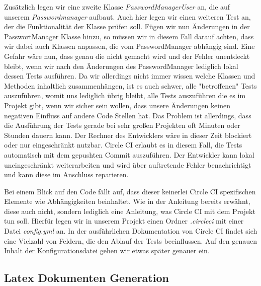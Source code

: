 \documentclass[11pt]{article}
\begin{document}
Zusätzlich legen wir eine zweite Klasse \textit{PasswordManagerUser} an, die auf unserem \textit{Passwordmanager} aufbaut. Auch hier legen wir einen weiteren Test an, der die Funktionalität der Klasse prüfen soll. Fügen wir nun Änderungen in der PasswortManager Klasse hinzu, so müssen wir in diesem Fall darauf achten, dass wir dabei auch Klassen anpassen, die vom PasswordManager abhängig sind. Eine Gefahr wäre nun, dass genau die nicht gemacht wird und der Fehler unentdeckt bleibt, wenn wir nach den Änderungen des PasswordManager lediglich lokal dessen Tests ausführen. Da wir allerdings nicht immer wissen welche Klassen und Methoden inhaltlich zusammenhängen, ist es auch  schwer, alle "betroffenen" Tests auszuführen, womit uns lediglich übrig bleibt, alle Tests auszuführen die es im Projekt gibt, wenn wir sicher sein wollen, dass unsere Änderungen keinen negativen Einfluss auf andere Code Stellen hat. Das Problem ist allerdings, dass die Ausführung der Tests gerade bei sehr großen Projekten oft Minuten oder Stunden dauern kann. Der Rechner des Entwicklers wäre in dieser Zeit blockiert oder nur eingeschränkt nutzbar. Circle CI erlaubt es in diesem Fall, die Tests automatisch mit dem gepushten Commit auszuführen. Der Entwickler kann lokal uneingeschränkt weiterarbeiten und wird über auftretende Fehler benachrichtigt und kann diese im Anschluss reparieren.

Bei einem Blick auf den Code fällt auf, dass dieser keinerlei Circle CI spezifischen Elemente wie Abhängigkeiten beinhaltet. Wie in der Anleitung bereits erwähnt, diese auch nicht, sondern lediglich eine Anleitung, was Circle CI mit dem Projekt tun soll. Hierfür legen wir in unserem Projekt einen Ordner
\textit{.circleci} mit einer Datei \textit{config.yml} an. In der ausführlichen Dokumentation von Circle CI
findet sich eine Vielzahl von Feldern, die den Ablauf der Tests beeinflussen. Auf den genauen Inhalt der Konfigurationsdatei gehen wir etwas später genauer ein.

\subsection{Latex Dokumenten Generation}
\end{document}
